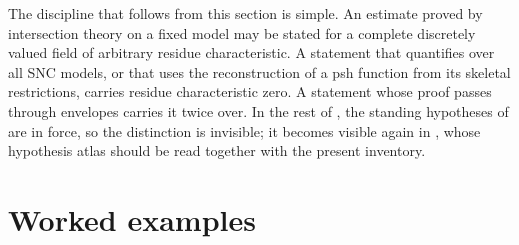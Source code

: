 \begin{remark}
\label{rem:ch22-how-to-state}
The discipline that follows from this section is simple.  An estimate proved
by intersection theory on a fixed model may be stated for a complete
discretely valued field of arbitrary residue characteristic.  A statement
that quantifies over all SNC models, or that uses the reconstruction of a
psh function from its skeletal restrictions, carries residue characteristic
zero.  A statement whose proof passes through envelopes carries it twice
over.  In the rest of , the standing hypotheses of
 are in force, so the distinction is invisible;
it becomes visible again in
, whose hypothesis atlas should be read together
with the present inventory.
\end{remark}

\section{Worked examples}
\label{sec:ch22-worked-examples}

